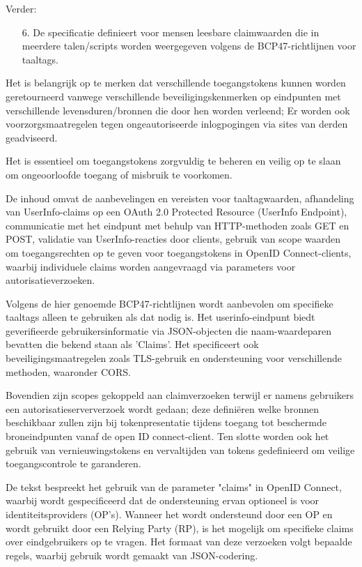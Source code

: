 Verder:
\begin{enumerate}
  \item[6.] De specificatie definieert voor mensen leesbare claimwaarden die in meerdere talen/scripts worden weergegeven volgens de BCP47-richtlijnen voor taaltags.
\end{enumerate}

Het is belangrijk op te merken dat verschillende toegangstokens kunnen worden geretourneerd vanwege verschillende beveiligingskenmerken op eindpunten met verschillende levensduren/bronnen die door hen worden verleend; Er worden ook voorzorgsmaatregelen tegen ongeautoriseerde inlogpogingen via sites van derden geadviseerd.


Het is essentieel om toegangstokens zorgvuldig te beheren en veilig op te slaan om ongeoorloofde toegang of misbruik te voorkomen.

De inhoud omvat de aanbevelingen en vereisten voor taaltagwaarden, afhandeling van UserInfo-claims op een OAuth 2.0 Protected Resource (UserInfo Endpoint), communicatie met het eindpunt met behulp van HTTP-methoden zoals GET en POST, validatie van UserInfo-reacties door clients, gebruik van scope waarden om toegangsrechten op te geven voor toegangstokens in OpenID Connect-clients, waarbij individuele claims worden aangevraagd via parameters voor autorisatieverzoeken.

Volgens de hier genoemde BCP47-richtlijnen wordt aanbevolen om specifieke taaltags alleen te gebruiken als dat nodig is. Het userinfo-eindpunt biedt geverifieerde gebruikersinformatie via JSON-objecten die naam-waardeparen bevatten die bekend staan als 'Claims'. Het specificeert ook beveiligingsmaatregelen zoals TLS-gebruik en ondersteuning voor verschillende methoden, waaronder CORS.

Bovendien zijn scopes gekoppeld aan claimverzoeken terwijl er namens gebruikers een autorisatieserververzoek wordt gedaan; deze definiëren welke bronnen beschikbaar zullen zijn bij tokenpresentatie tijdens toegang tot beschermde broneindpunten vanaf de open ID connect-client.
Ten slotte worden ook het gebruik van vernieuwingstokens en vervaltijden van tokens gedefinieerd om veilige toegangscontrole te garanderen.

De tekst bespreekt het gebruik van de parameter "claims" in OpenID Connect, waarbij wordt gespecificeerd dat de ondersteuning ervan optioneel is voor identiteitsproviders (OP's). Wanneer het wordt ondersteund door een OP en wordt gebruikt door een Relying Party (RP), is het mogelijk om specifieke claims over eindgebruikers op te vragen. Het formaat van deze verzoeken volgt bepaalde regels, waarbij gebruik wordt gemaakt van JSON-codering.

